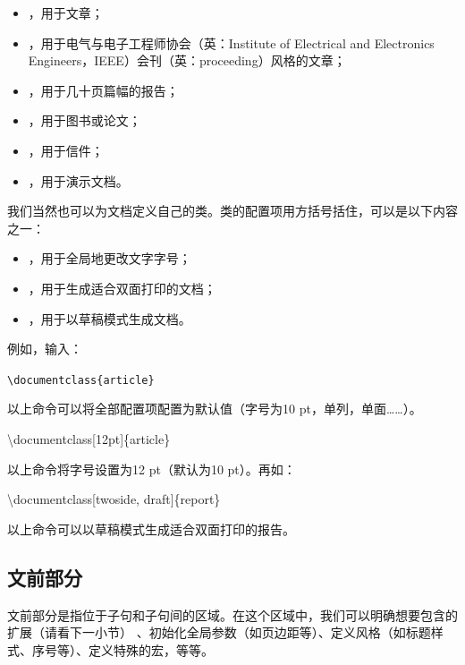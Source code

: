 \begin{itemize}
    \item {}，用于文章；
    \item {}，用于电气与电子工程师协会（英：Institute of Electrical and Electronics Engineers，IEEE）会刊（英：proceeding）风格的文章；
    \item {}，用于几十页篇幅的报告；
    \item {}，用于图书或论文；
    \item {}，用于信件；
    \item {}，用于演示文档。
\end{itemize}

我们当然也可以为文档定义自己的类。类的配置项用方括号括住，可以是以下内容之一：

\begin{itemize}
    \item \dm{11pt, 12pt}，用于全局地更改文字字号；
    \item {}，用于生成适合双面打印的文档；
    \item {}，用于以草稿模式生成文档。
\end{itemize}

例如，输入：

\begin{dmd}
\verb|\documentclass{article}|
\end{dmd}

以上命令可以将全部配置项配置为默认值（字号为10 pt，单列，单面……）。

\begin{dmd}
    \backslash documentclass[12pt]\{article\}
\end{dmd}

以上命令将字号设置为12 pt（默认为10 pt）。再如：

\begin{dmd}
    \backslash documentclass[twoside, draft]\{report\}
\end{dmd}

以上命令可以以草稿模式生成适合双面打印的报告。

\subsection{文前部分}

文前部分是指位于子句和子句间的区域。在这个区域中，我们可以明确想要包含的扩展（请看下一小节）%
、初始化全局参数（如页边距等）、定义风格（如标题样式、序号等）、定义特殊的宏，等等。

